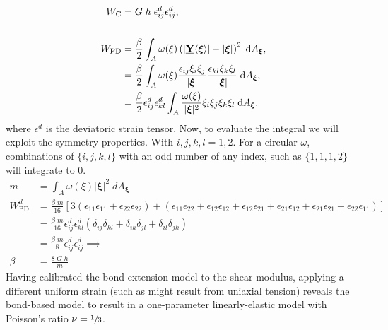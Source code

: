 \documentclass[preprint,review,12pt]{elsarticle}
\newcommand\vstate[3]{%
	\mathbf{\underline{#1}}%
	\ifstrempty{#2}{}{[#2]}%
	\ifstrempty{#3}{}{\langle #3 \rangle}}
\begin{document}
%
\begin{align*}
    W_\text{C} &= G \; h \; \epsilon_{ij}^d \epsilon_{ij}^d,  \\  \\
    W_\text{PD} &= \frac{\beta}{2}\int_A \omega(\xi)\left(|\vstate{Y}{}{\boldsymbol{\xi}}|-|\boldsymbol{\xi}|\right)^2 \; {\rm d}A_{\boldsymbol{\xi}}, \\
    &=\frac{\beta}{2}\int_A  \omega(\xi) \frac{\epsilon_{ij}\xi_i \xi_j }{|\boldsymbol{\xi}|} \frac{\epsilon_{kl} \xi_k \xi_l }{|\boldsymbol{\xi}|}\;{\rm d}A_{\boldsymbol{\xi}},\\
    &=\frac{\beta}{2} \epsilon_{ij}^d \epsilon_{kl}^d \int_A \frac{ \omega(\xi)}{|\boldsymbol{\xi}|^2}\xi_i \xi_j \xi_k \xi_l \;{\rm d}A_{\boldsymbol{\xi}}.
\end{align*}
%
where $\epsilon^d$ is the deviatoric strain tensor.  Now, to evaluate the integral we will exploit the symmetry properties. With $i, j, k, l = 1,2$. For a circular $\omega$, combinations of $\{i,j,k,l\}$ with an odd number of any index, such as $\{1,1,1,2\}$ will integrate to 0.
%
\begin{align*}
    m &= \int_A \omega(\xi)|\boldsymbol{\xi}|^2\; dA_{\boldsymbol{\xi}} \\
    W^d_\text{PD} &= \frac{\beta \; m}{16}[3(\epsilon_{11}\epsilon_{11}+\epsilon_{22}\epsilon_{22})+(\epsilon_{11}\epsilon_{22}+\epsilon_{12}\epsilon_{12}+\epsilon_{12}\epsilon_{21}+\epsilon_{21}\epsilon_{12}+\epsilon_{21}\epsilon_{21}+\epsilon_{22}\epsilon_{11})]\\
    &= \frac{\beta \; m}{16} \epsilon_{ij}^d \epsilon_{kl}^d (\delta_{ij}\delta_{kl}+\delta_{ik}\delta_{jl}+\delta_{il}\delta_{jk})\\
    &= \frac{\beta \; m}{8} \epsilon_{ij}^d \epsilon_{ij}^d \implies\\
     \beta &= \frac{8 \; G\;h}{m}
\end{align*}
%
Having calibrated the bond-extension model to the shear modulus, applying a different uniform strain (such as might result from uniaxial tension) reveals the bond-based model to result in a one-parameter linearly-elastic model with Poisson's ratio \(\nu=\sfrac{1}{3}\).  
\end{document}
